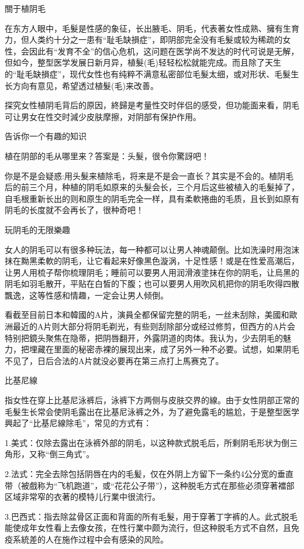\documentclass[12pt,UTF8]{ctexbook}
\begin{document}
關于植阴毛

在东方人眼中，毛髮是性感的象征，长出腋毛、阴毛，代表著女性成熟、擁有生育力，但人类约十分之一患有“耻毛缺損症”，即阴部完全没有毛髮或较为稀疏的女性，会因此有“发育不全”的信心危机，这问题在医学尚不发达的时代可说是无解，但如今，整型医学发展日新月异，植髮(毛)轻轻松松就能完成。而且除了天生的“耻毛缺損症”，现代女性也有纯粹不满意私密部位毛髮太细，或对形状、毛髮生长方向有意见，希望透过植髮(毛)来改善。

探究女性植阴毛背后的原因，終歸是考量性交时伴侣的感受，但功能面来看，阴毛可让男女在性交时減少皮肤摩擦，对阴部有保护作用。

告诉你一个有趣的知识

植在阴部的毛从哪里来？答案是：头髮，很令你驚訝吧！

你是不是会疑惑:用头髮来植除毛，将来是不是会一直长？其实是不会的。植阴毛后的前三个月，种植的阴毛如原来的头髮会长，三个月后这些被植入的毛髮掉了，自毛根重新长出的则和原生的阴毛完全一样，具有柔軟捲曲的毛质，且长到如原有阴毛的长度就不会再长了，很种奇吧！

玩阴毛的无限樂趣

女人的阴毛可以有很多种玩法，每一种都可以让男人神魂颠倒。比如洗澡时用泡沫抹在黝黑柔軟的阴毛，让它看起来好像黑色漩涡，十足性感！或是在性爱高潮后，让男人用梳子帮你梳理阴毛；睡前可以要男人用润滑液塗抹在你的阴毛，让烏黑的阴毛如羽毛散开，平贴在白皙的下腹；也可以要男人用吹风机把你的阴毛吹得四散飄逸，这等性感和情趣，一定会让男人倾倒。

看截至目前日本和韓國的A片，演員全都保留完整的阴毛，一丝未刮除，美國和歐洲最近的A片则大部分将阴毛剃光，有些则刮除部分或经过修剪，但西方的A片会特别把鏡头聚焦在隐蒂，把阴唇翻开，外露阴道的肉体。我认为，少去阴毛的魅力，把埋藏在里面的秘密赤裸的展现出来，成了另外一种不必要。试想，如果阴毛不见了，日后合法的A片就没必要再在第三点打上馬赛克了。

比基尼線

指女性在穿上比基尼泳裤后，泳裤下方两侧与皮肤交界的線。由于女性阴部正常的毛髮生长常会使阴毛露出在比基尼泳裤之外，为了避免露毛的尴尬，于是整型医学興起了“比基尼線除毛”，常见的方式有：

1.美式：仅除去露出在泳裤外部的阴毛，以这种款式脱毛后，所剩阴毛形状为倒三角形，又称“倒三角式”。

2.法式：完全去除包括阴唇在内的毛髪，仅在外阴上方留下一条约4公分宽的垂直带（被戲称为“飞机跑道”，或“花花公子带”），这种脱毛方式在那些必须穿著襠部区域非常窄的衣著的模特儿行業中很流行。

3.巴西式：指去除盆骨区正面和背面的所有毛髮，用于穿著丁字裤的人。此式脱毛能使成年女性看上去像女孩，在性行業中颇为流行，但这种脱毛方式不自然，且免疫系統差的人在施作过程中会有感染的风险。
\end{document}
